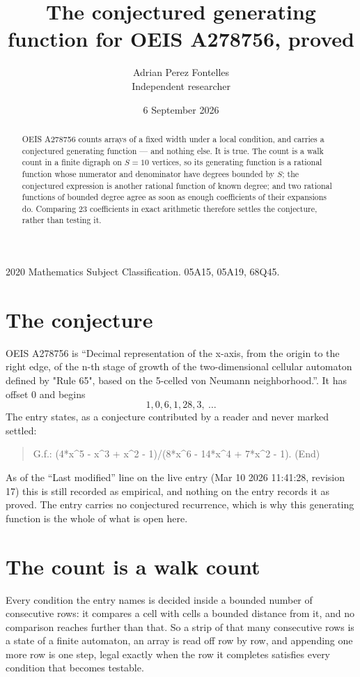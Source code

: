 \documentclass[11pt,a4paper]{article}
\title{The conjectured generating function for OEIS A278756, proved}
\author{Adrian Perez Fontelles\\ \small Independent researcher}
\date{6 September 2026}
\theoremstyle{plain}
\theoremstyle{definition}
\begin{document}
\maketitle

\begin{abstract}
OEIS A278756 counts arrays of a fixed width under a local condition, and carries a conjectured
generating function --- and nothing else. It is true. The count is a walk count in a finite
digraph on $S=10$ vertices, so its generating function is a rational function whose numerator
and denominator have degrees bounded by $S$; the conjectured expression is another rational
function of known degree; and two rational functions of bounded degree agree as soon as enough
coefficients of their expansions do. Comparing $23$ coefficients in exact arithmetic
therefore settles the conjecture, rather than testing it.
\end{abstract}

\noindent\small 2020 Mathematics Subject Classification. 05A15, 05A19, 68Q45.\normalsize

\section{The conjecture}

OEIS A278756 is ``Decimal representation of the x-axis, from the origin to the right edge, of the n-th stage of growth of the two-dimensional cellular automaton defined by "Rule 65", based on the 5-celled von Neumann neighborhood.''. It has offset $0$ and begins
\[
1, 0, 6, 1, 28, 3,\ \dots
\]
The entry states, as a conjecture contributed by a reader and never marked settled:
\begin{quote}
G.f.: (4*x\^{}5 - x\^{}3 + x\^{}2 - 1)/(8*x\^{}6 - 14*x\^{}4 + 7*x\^{}2 - 1). (End)
\end{quote}
As of the ``Last modified'' line on the live entry (Mar 10 2026 11:41:28, revision 17) this is still
recorded as empirical, and nothing on the entry records it as proved. The entry carries no
conjectured recurrence, which is why this generating function is the whole of what is open
here.

\section{The count is a walk count}

Every condition the entry names is decided inside a bounded number of consecutive rows: it
compares a cell with cells a bounded distance from it, and no comparison reaches further than
that. So a strip of that many consecutive rows is a state of a finite automaton, an array is
read off row by row, and appending one more row is one step, legal exactly when the row it
completes satisfies every condition that becomes testable.
\end{document}

